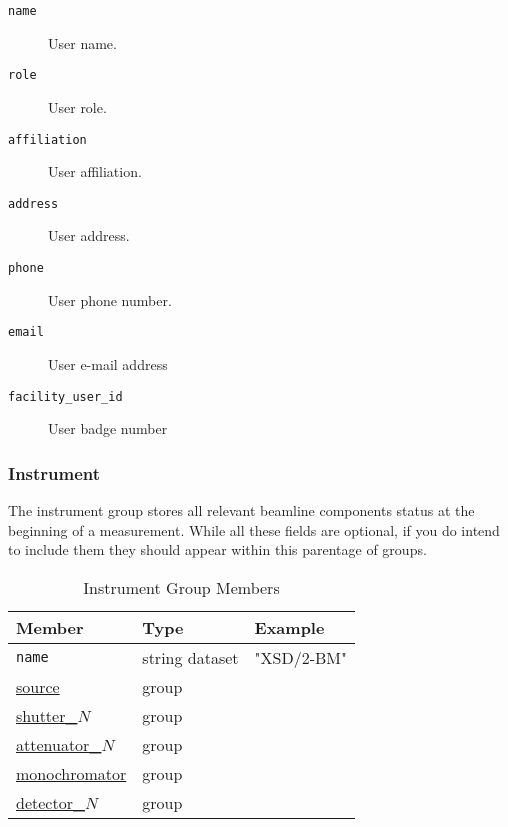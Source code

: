 \begin{description}
\item[\tt {name}] {User name.}    

\item[\tt {role}] {User role.}

\item[\tt {affiliation}] {User affiliation.} 

\item[\tt {address}] {User address.}  

\item[\tt {phone}] {User phone number.} 

\item[\tt {email}] {User e-mail address} 

\item[\tt {facility\_user\_id}] {User badge number }
\end{description}

\subsubsection{Instrument}
\label{table:instrument}

The instrument group stores all relevant beamline components status at the beginning of 
a measurement. While all these fields are optional, if you do intend to include them they 
should appear within this parentage of groups.

\begin{table}[h!]\sffamily \footnotesize
\centering
\caption{Instrument Group Members}
\begin{tabular}{l l l}
\toprule
\bfseries Member     & \bfseries Type & \bfseries Example \\
\midrule

\tt{name} & string dataset & "XSD/2-BM" \\
\hyperref[table:source]{source} &  group & \\
\hyperref[table:shutter]{shutter\_$N$}  &  group & \\
\hyperref[table:attenuator]{attenuator\_$N$} & group & \\
\hyperref[table:monochromator]{monochromator} & group & \\
\hyperref[table:detector]{detector\_$N$} & group & \\
\bottomrule
\end{tabular}
\end{table}

